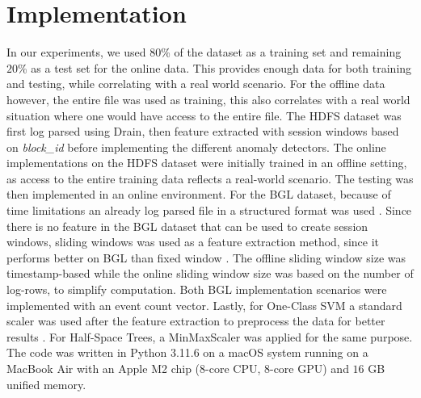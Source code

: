 \section{Implementation}
In our experiments, we used $80$\% of the dataset as a training set and remaining $20$\% as a test set for the online data. This provides enough data for both training and testing, while correlating with a real world scenario.  For the offline data however, the entire file was used as training, this also correlates with a real world situation where one would have access to the entire file. The HDFS dataset was first log parsed using Drain, then feature extracted with session windows based on \textit{block\_id} before implementing the different anomaly detectors. The online implementations on the HDFS dataset were initially trained in an offline setting, as access to the entire training data reflects a real-world scenario. The testing was then implemented in an online environment. For the BGL dataset, because of time limitations an already log parsed file in a structured format was used \cite{zhu2023loghublargecollectionlog} \cite{4273008}. Since there is no feature in the BGL dataset that can be used to create session windows, sliding windows was used as a feature extraction method, since it performs better on BGL than fixed window \cite{Shilin2017experiencereport}. The offline sliding window size was timestamp-based while the online sliding window size was based on the number of log-rows, to simplify computation. Both BGL implementation scenarios were implemented with an event count vector. Lastly, for One-Class SVM a standard scaler was used after the feature extraction to preprocess the data for better results \cite{montiel2021river}. For Half-Space Trees, a MinMaxScaler was applied for the same purpose.  The code was written in Python 3.11.6 on a macOS system running on a MacBook Air with an Apple M2 chip ($8$-core CPU, $8$-core GPU) and $16$ GB unified memory. 